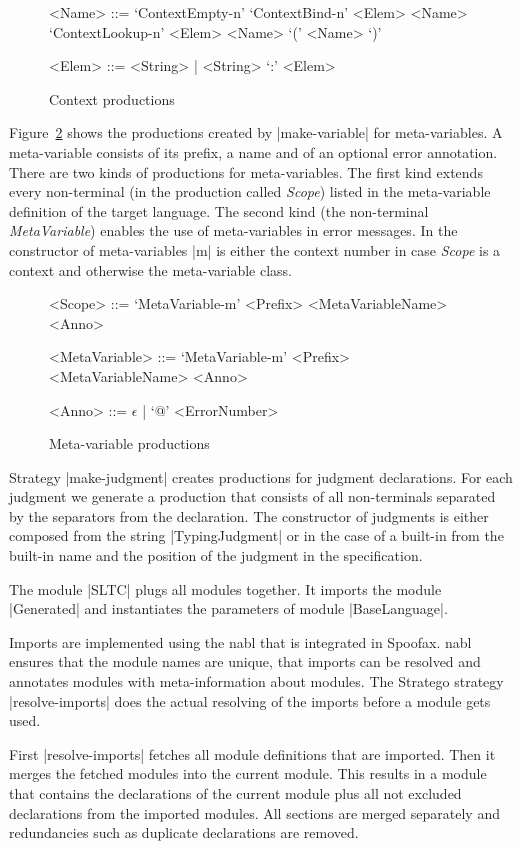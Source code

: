 \begin{figure}
\begin{grammar}
  <Name> ::= `ContextEmpty-n'
  \alt `ContextBind-n' <Elem> <Name>
  \alt `ContextLookup-n' <Elem> <Name>
  \alt `(' <Name> `)'

  <Elem> ::= <String> | <String> `:' <Elem>
\end{grammar}
\caption{Context productions}
\label{fig:context-productions}
\end{figure}

Figure~\ref{fig:meta-variable-productions} shows the productions
created by \code|make-variable| for meta-variables. A meta-variable
consists of its prefix, a name and of an optional error
annotation. There are two kinds of productions for meta-variables. The
first kind extends every non-terminal (in the production called
\textit{Scope}) listed in the meta-variable definition of the target
language. The second kind (the non-terminal \emph{MetaVariable})
enables the use of meta-variables in error messages. In the
constructor of meta-variables \code|m| is either the context number in
case \textit{Scope} is a context and otherwise the meta-variable
class.

\begin{figure}
\begin{grammar}
  <Scope> ::= `MetaVariable-m' <Prefix> <MetaVariableName> <Anno>

  <MetaVariable> ::= `MetaVariable-m' <Prefix> <MetaVariableName>
  <Anno>

  <Anno> ::= $\epsilon$ | `@' <ErrorNumber>
\end{grammar}
\caption{Meta-variable productions}
\label{fig:meta-variable-productions}
\end{figure}

Strategy \code|make-judgment| creates productions for judgment
declarations. For each judgment we generate a production that consists
of all non-terminals separated by the separators from the
declaration. The constructor of judgments is either composed from the
string \code|TypingJudgment| or in the case of a built-in from the
built-in name and the position of the judgment in the specification.

The module \code|SLTC| plugs all modules together. It imports the
module \code|Generated| and instantiates the parameters of module
\code|BaseLanguage|.

Imports are implemented using the \gls{nabl} that is integrated in
Spoofax. \gls{nabl} ensures that the module names are unique, that
imports can be resolved and annotates modules with meta-information
about modules. The Stratego strategy \code|resolve-imports| does the
actual resolving of the imports before a module gets used.

First \code|resolve-imports| fetches all module definitions that are
imported. Then it merges the fetched modules into the current
module. This results in a module that contains the declarations of the
current module plus all not excluded declarations from the imported
modules. All sections are merged separately and redundancies such as
duplicate declarations are removed.

